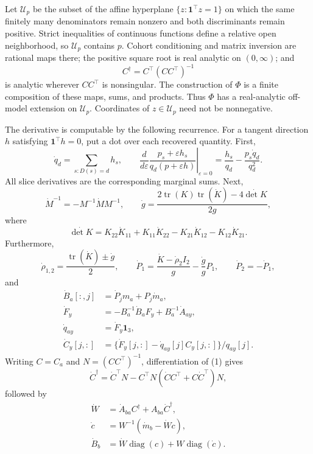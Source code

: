 Let \(\mathcal U_p\) be the subset of the affine hyperplane \(\{z:\mathbf 1^\top z=1\}\) on which the same finitely many denominators remain nonzero and both discriminants remain positive.  Strict inequalities of continuous functions define a relative open neighborhood, so \(\mathcal U_p\) contains \(p\).  Cohort conditioning and matrix inversion are rational maps there; the positive square root is real analytic on \((0,\infty)\); and
\[
 C^\dagger=C^\top(CC^\top)^{-1}                             \tag{1}
\]
is analytic wherever \(CC^\top\) is nonsingular.  The construction of \(\Phi\) is a finite composition of these maps, sums, and products.  Thus \(\Phi\) has a real-analytic off-model extension on \(\mathcal U_p\).  Coordinates of \(z\in\mathcal U_p\) need not be nonnegative.

The derivative is computable by the following recurrence.  For a tangent direction \(h\) satisfying \(\mathbf 1^\top h=0\), put a dot over each recovered quantity.  First,
\[
 \dot q_d=\sum_{s:D(s)=d}h_s,
 \qquad
 \left.\frac{d}{d\varepsilon}
 \frac{p_s+\varepsilon h_s}{q_d(p+\varepsilon h)}\right|_{\varepsilon=0}
 =\frac{h_s}{q_d}-\frac{p_s\dot q_d}{q_d^2}.                \tag{2}
\]
All slice derivatives are the corresponding marginal sums.  Next,
\[
 \dot M^{-1}=-M^{-1}\dot M M^{-1},
 \qquad
 \dot g=\frac{2\operatorname{tr}(K)\operatorname{tr}(\dot K)-4\dot{\det K}}{2g},              \tag{3}
\]
where
\[
 \dot{\det K}=K_{22}\dot K_{11}+K_{11}\dot K_{22}
              -K_{21}\dot K_{12}-K_{12}\dot K_{21}.       \tag{4}
\]
Furthermore,
\[
 \dot\rho_{1,2}=\frac{\operatorname{tr}(\dot K)\mathbin{\pm}\dot g}{2},\qquad
 \dot P_1=\frac{\dot K-\dot\rho_2I_2}{g}-\frac{\dot g}{g}P_1,
 \qquad \dot P_2=-\dot P_1,                               \tag{5}
\]
and
\[
 \begin{aligned}
 \dot B_a[:,j]&=\dot P_jm_a+P_j\dot m_a,\\
 \dot F_y&=-B_a^{-1}\dot B_aF_y+B_a^{-1}\dot A_{ay},\\
 \dot q_{ay}&=\dot F_y\mathbf 1_3,\\
 \dot C_y[j,:]&=\{\dot F_y[j,:]-\dot q_{ay}[j]C_y[j,:]\}/q_{ay}[j].
 \end{aligned}                                               \tag{6}
\]
Writing \(C=C_a\) and \(N=(CC^\top)^{-1}\), differentiation of (1) gives
\[
 \dot C^\dagger
 =\dot C^\top N-C^\top N(\dot C C^\top+C\dot C^\top)N,   \tag{7}
\]
followed by
\[
 \begin{aligned}
 \dot W&=\dot A_{ba}C^\dagger+A_{ba}\dot C^\dagger,\\
 \dot c&=W^{-1}(\dot m_b-\dot Wc),\\
 \dot B_b&=\dot W\operatorname{diag}(c)+W\operatorname{diag}(\dot c).
 \end{aligned}                                               \tag{8}
\]

